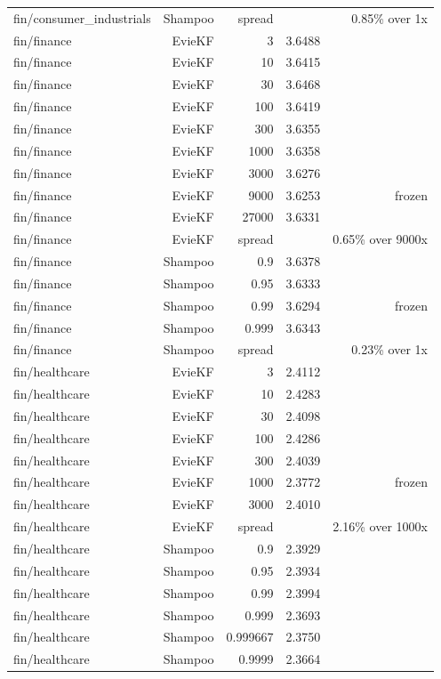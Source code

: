 \begin{table}[t]
\begin{tabular}{lrrrr}
fin/consumer\_industrials & Shampoo & spread &  & 0.85\% over 1x \\
fin/finance & EvieKF & 3 & 3.6488 &  \\
fin/finance & EvieKF & 10 & 3.6415 &  \\
fin/finance & EvieKF & 30 & 3.6468 &  \\
fin/finance & EvieKF & 100 & 3.6419 &  \\
fin/finance & EvieKF & 300 & 3.6355 &  \\
fin/finance & EvieKF & 1000 & 3.6358 &  \\
fin/finance & EvieKF & 3000 & 3.6276 &  \\
fin/finance & EvieKF & 9000 & 3.6253 & frozen \\
fin/finance & EvieKF & 27000 & 3.6331 &  \\
fin/finance & EvieKF & spread &  & 0.65\% over 9000x \\
fin/finance & Shampoo & 0.9 & 3.6378 &  \\
fin/finance & Shampoo & 0.95 & 3.6333 &  \\
fin/finance & Shampoo & 0.99 & 3.6294 & frozen \\
fin/finance & Shampoo & 0.999 & 3.6343 &  \\
fin/finance & Shampoo & spread &  & 0.23\% over 1x \\
fin/healthcare & EvieKF & 3 & 2.4112 &  \\
fin/healthcare & EvieKF & 10 & 2.4283 &  \\
fin/healthcare & EvieKF & 30 & 2.4098 &  \\
fin/healthcare & EvieKF & 100 & 2.4286 &  \\
fin/healthcare & EvieKF & 300 & 2.4039 &  \\
fin/healthcare & EvieKF & 1000 & 2.3772 & frozen \\
fin/healthcare & EvieKF & 3000 & 2.4010 &  \\
fin/healthcare & EvieKF & spread &  & 2.16\% over 1000x \\
fin/healthcare & Shampoo & 0.9 & 2.3929 &  \\
fin/healthcare & Shampoo & 0.95 & 2.3934 &  \\
fin/healthcare & Shampoo & 0.99 & 2.3994 &  \\
fin/healthcare & Shampoo & 0.999 & 2.3693 &  \\
fin/healthcare & Shampoo & 0.999667 & 2.3750 &  \\
fin/healthcare & Shampoo & 0.9999 & 2.3664 &  \\

\end{tabular}
\end{table}
